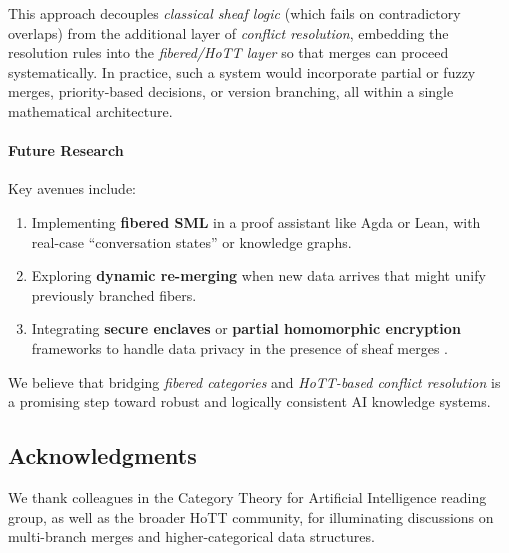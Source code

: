 \documentclass{article}
\begin{document}
This approach decouples \emph{classical sheaf logic} (which fails on contradictory overlaps) from the additional layer of \emph{conflict resolution}, embedding the resolution rules into the \emph{fibered/HoTT layer} so that merges can proceed systematically. In practice, such a system would incorporate partial or fuzzy merges, priority-based decisions, or version branching, all within a single mathematical architecture.

\paragraph{Future Research}
Key avenues include:
\begin{enumerate}
    \item Implementing \textbf{fibered SML} in a proof assistant like Agda or Lean, with real-case “conversation states” or knowledge graphs.
    \item Exploring \textbf{dynamic re-merging} when new data arrives that might unify previously branched fibers.
    \item Integrating \textbf{secure enclaves} or \textbf{partial homomorphic encryption} frameworks to handle data privacy in the presence of sheaf merges \citep{secureSheafMerges2025}.
\end{enumerate}
We believe that bridging \emph{fibered categories} and \emph{HoTT-based conflict resolution} is a promising step toward robust and logically consistent AI knowledge systems.

\subsection*{Acknowledgments}
We thank colleagues in the Category Theory for Artificial Intelligence reading group, as well as the broader HoTT community, for illuminating discussions on multi-branch merges and higher-categorical data structures.
\end{document}
